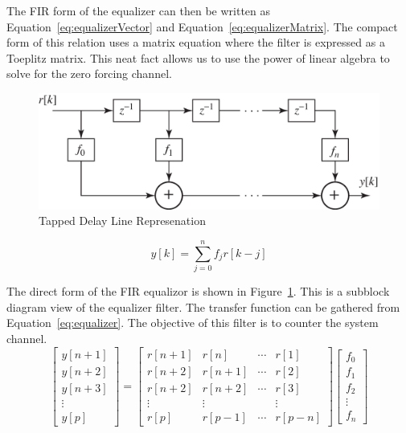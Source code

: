 \documentclass[]{article}
\begin{document}
The FIR form of the equalizer can then be written as Equation~\ref{eq:equalizerVector} and Equation~\ref{eq:equalizerMatrix}.  The compact form of this relation uses a matrix equation where the filter is expressed as a Toeplitz matrix.  This neat fact allows us to use the power of linear algebra to solve for the zero forcing channel.  
  
 
\begin{figure}[H]
\centering
\includegraphics[width=.6\textwidth]{tapEqualizer.png}
\caption{Tapped Delay Line Represenation\label{fig:tap}}
\end{figure}

\begin{equation}
\label{eq:equalizer}
y\left[k\right] = \sum_{j=0}^n f_jr\left[k-j\right]
\end{equation}

The direct form of the FIR equalizor is shown in Figure~\ref{fig:tap}.  This is a subblock diagram view of the equalizer filter.  The transfer function can be gathered from Equation~\ref{eq:equalizer}.  The objective of this filter is to counter the system channel.  \\

\begin{equation}
\label{eq:equalizerVector}
\left[ \begin{array}{c}
 y \left[n+1\right] \\
 y \left[n+2\right] \\
 y \left[n+3\right] \\
\vdots  \\
y\left[ p \right] \end{array} \right] = 
\begin{bmatrix} 
r \left[ n+1\right]  & r[n] & \cdots & r\left[ 1 \right] \\ 
r \left[ n+2\right]  & r[n+1] & \cdots & r\left[ 2 \right] \\ 
r \left[ n+2\right]  & r[n+2] & \cdots & r\left[ 3 \right] \\ 
\vdots & \vdots & & \vdots \\
r \left[p \right] & r\left[ p-1 \right] & \cdots & r\left[ p-n \right]
\end{bmatrix}
 \left[ \begin{array}{c} f_0 \\ f_1 \\ f_2 \\ \vdots \\ f_n \end{array} \right]
\end{equation}
\end{document}

